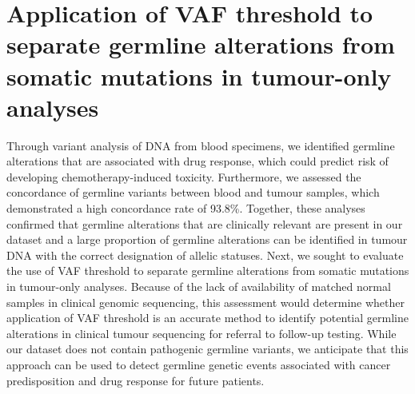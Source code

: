 \section{Application of VAF threshold to separate germline alterations from somatic mutations in tumour-only analyses}
\label{sec:ApplicationofVAFthresholdtoseparategermlinealterationsfromsomaticmutationsintumour-onlyanalyses}

Through variant analysis of DNA from blood specimens, we identified germline alterations that are associated with drug response, which could predict risk of developing chemotherapy-induced toxicity. Furthermore, we assessed the concordance of germline variants between blood and tumour samples, which demonstrated a high concordance rate of 93.8\%. Together, these analyses confirmed that germline alterations that are clinically relevant are present in our dataset and a large proportion of germline alterations can be identified in tumour DNA with the correct designation of allelic statuses. Next, we sought to evaluate the use of VAF threshold to separate germline alterations from somatic mutations in tumour-only analyses. Because of the lack of availability of matched normal samples in clinical genomic sequencing, this assessment would determine whether application of VAF threshold is an accurate method to identify potential germline alterations in clinical tumour sequencing for referral to follow-up testing. While our dataset does not contain pathogenic germline variants, we anticipate that this approach can be used to detect germline genetic events associated with cancer predisposition and drug response for future patients.

